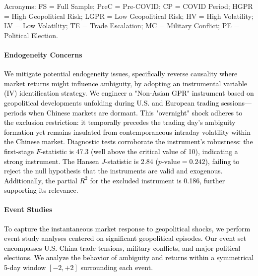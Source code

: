 \documentclass[preprint,12pt,authoryear]{elsarticle}
\begin{document}
\begin{table}[htbp]
\begin{threeparttable}
\begin{tablenotes}[flushleft]
\item[] Acronyms: FS = Full Sample; PreC = Pre-COVID; CP = COVID Period; HGPR = High Geopolitical Risk; LGPR = Low Geopolitical Risk; HV = High Volatility; LV = Low Volatility; TE = Trade Escalation; MC = Military Conflict; PE = Political Election.
\end{tablenotes}
\end{threeparttable}
\end{table}

\paragraph{Endogeneity Concerns} \textcolor{black}{We mitigate potential endogeneity issues, specifically reverse causality where market returns might influence ambiguity, by adopting an instrumental variable (IV) identification strategy. We engineer a "Non-Asian GPR" instrument based on geopolitical developments unfolding during U.S. and European trading sessions—periods when Chinese markets are dormant. This "overnight" shock adheres to the exclusion restriction: it temporally precedes the trading day's ambiguity formation yet remains insulated from contemporaneous intraday volatility within the Chinese market.} \textcolor{black}{ \textcolor{black}{Diagnostic tests corroborate the instrument's robustness:} the first-stage $F$-statistic is 47.3 (well above the critical value of 10), indicating a strong instrument. The Hansen $J$-statistic is 2.84 ($p\text{-value} = 0.242$), failing to reject the null hypothesis that the instruments are valid and exogenous. Additionally, the partial $R^2$ for the excluded instrument is 0.186, further supporting its relevance.}

\paragraph{Event Studies} \textcolor{black}{To capture the instantaneous market response to geopolitical shocks, we perform event study analyses centered on significant geopolitical episodes. Our event set encompasses U.S.-China trade tensions, military conflicts, and major political elections. We analyze the behavior of ambiguity and returns within a symmetrical 5-day window $[-2, +2]$ surrounding each event.}
\end{document}
